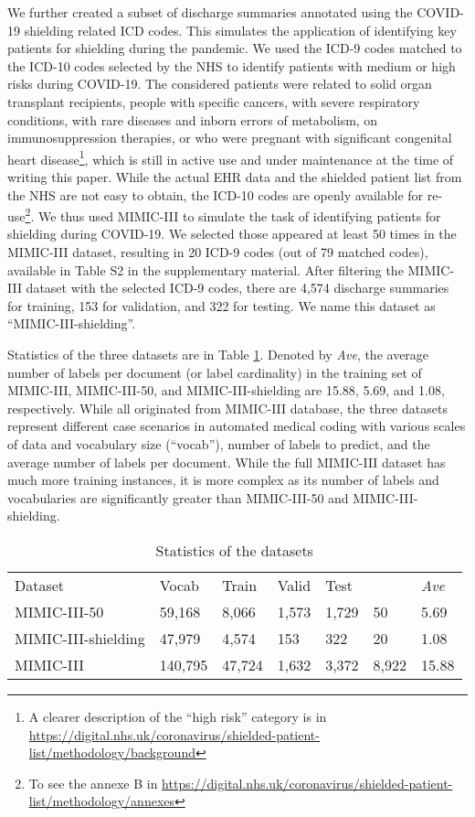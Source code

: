 \documentclass[final,5p,times,twocolumn]{elsarticle}
\begin{document}
We further created a subset of discharge summaries annotated using the COVID-19 shielding related ICD codes. This simulates the application of identifying key patients for shielding during the pandemic. We used the ICD-9 codes matched to the ICD-10 codes selected by the NHS to identify patients with medium or high risks during COVID-19. The considered patients were related to solid organ transplant recipients, people with specific cancers, with severe respiratory conditions, with rare diseases and inborn errors of metabolism, on immunosuppression therapies, or who were pregnant with significant congenital heart disease\footnote{A clearer description of the ``high risk'' category is in \url{https://digital.nhs.uk/coronavirus/shielded-patient-list/methodology/background}}, which is still in active use and under maintenance at the time of writing this paper. While the actual EHR data and the shielded patient list from the NHS are not easy to obtain, the ICD-10 codes are openly available for re-use\footnote{To see the annexe B in \url{https://digital.nhs.uk/coronavirus/shielded-patient-list/methodology/annexes}}. We thus used MIMIC-III to simulate the task of identifying patients for shielding during COVID-19. We selected those appeared at least 50 times in the MIMIC-III dataset, resulting in 20 ICD-9 codes (out of 79 matched codes), available in Table S2 in the supplementary material. After filtering the MIMIC-III dataset with the selected ICD-9 codes, there are 4,574 discharge summaries for training, 153 for validation, and 322 for testing. We name this dataset as ``MIMIC-III-shielding''.

Statistics of the three datasets are in Table \ref{data_stat}. Denoted by \textit{Ave}, the average number of labels per document (or label cardinality) in the training set of MIMIC-III, MIMIC-III-50, and MIMIC-III-shielding are 15.88, 5.69, and 1.08, respectively. While all originated from MIMIC-III database, the three datasets represent different case scenarios in automated medical coding with various scales of data and vocabulary size (``vocab''), number of labels to predict, and the average number of labels per document. While the full MIMIC-III dataset has much more training instances, it is more complex as its number of labels  and vocabularies are significantly greater than MIMIC-III-50 and MIMIC-III-shielding.
\begin{table}[h]
\caption{Statistics of the datasets}
\footnotesize
\center
\label{data_stat}
\begin{tabular}{p{2.4cm}p{0.7cm}p{0.6cm}p{0.5cm}p{0.5cm}p{0.5cm}p{0.5cm}}
\cline{1-7}
Dataset                  & Vocab & Train & Valid & Test &  & \textit{Ave}\\
\cline{1-7}
MIMIC-III-50             & 59,168 & 8,066  & 1,573 & 1,729 & 50 & 5.69\\
MIMIC-III-shielding      & 47,979 & 4,574  & 153 & 322 & 20 & 1.08\\
MIMIC-III                & 140,795 & 47,724  & 1,632 & 3,372 & 8,922 & 15.88\\
\cline{1-7}
\end{tabular}
\end{table}
\end{document}
